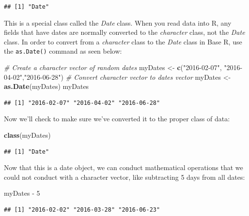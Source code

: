 \documentclass[]{book}
\newenvironment{Shaded}{\begin{snugshade}}{\end{snugshade}}
\newcommand{\KeywordTok}[1]{\textcolor[rgb]{0.13,0.29,0.53}{\textbf{{#1}}}}
\newcommand{\DecValTok}[1]{\textcolor[rgb]{0.00,0.00,0.81}{{#1}}}
\newcommand{\StringTok}[1]{\textcolor[rgb]{0.31,0.60,0.02}{{#1}}}
\newcommand{\CommentTok}[1]{\textcolor[rgb]{0.56,0.35,0.01}{\textit{{#1}}}}
\newcommand{\NormalTok}[1]{{#1}}
\begin{document}
\begin{verbatim}
## [1] "Date"
\end{verbatim}

This is a special class called the \emph{Date} class. When you read data
into R, any fields that have dates are normally converted to the
\emph{character} class, not the \emph{Date} class. In order to convert
from a \emph{character} class to the \emph{Date} class in Base R, use
the \texttt{as.Date()} command as seen below:

\begin{Shaded}
\begin{Highlighting}[]
\CommentTok{# Create a character vector of random dates}
\NormalTok{myDates <-}\StringTok{ }\KeywordTok{c}\NormalTok{(}\StringTok{"2016-02-07"}\NormalTok{, }\StringTok{"2016-04-02"}\NormalTok{,}\StringTok{"2016-06-28"}\NormalTok{)}
\CommentTok{# Convert character vector to dates vector}
\NormalTok{myDates <-}\StringTok{ }\KeywordTok{as.Date}\NormalTok{(myDates)}
\NormalTok{myDates}
\end{Highlighting}
\end{Shaded}

\begin{verbatim}
## [1] "2016-02-07" "2016-04-02" "2016-06-28"
\end{verbatim}

Now we'll check to make sure we've converted it to the proper class of
data:

\begin{Shaded}
\begin{Highlighting}[]
\KeywordTok{class}\NormalTok{(myDates)}
\end{Highlighting}
\end{Shaded}

\begin{verbatim}
## [1] "Date"
\end{verbatim}

Now that this is a date object, we can conduct mathematical operations
that we could not conduct with a character vector, like subtracting 5
days from all dates:

\begin{Shaded}
\begin{Highlighting}[]
\NormalTok{myDates -}\StringTok{ }\DecValTok{5}
\end{Highlighting}
\end{Shaded}

\begin{verbatim}
## [1] "2016-02-02" "2016-03-28" "2016-06-23"
\end{verbatim}
\end{document}
